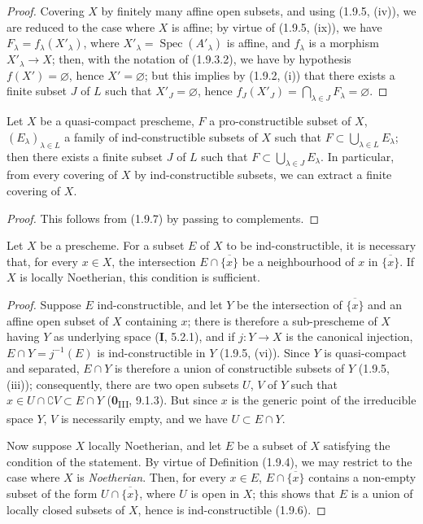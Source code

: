 \begin{proof}
Covering $X$ by finitely many affine open subsets, and using (1.9.5,
(iv)), we are reduced to the case where $X$ is affine; by virtue of (1.9.5,
(ix)), we have $F_\lambda=f_\lambda(X'_\lambda)$,
where $X'_\lambda=\operatorname{Spec}(A'_\lambda)$ is affine, and $f_\lambda$
is a morphism $X'_\lambda\to X$; then, with the notation of (1.9.3.2),
we have by hypothesis $f(X')=\varnothing$, hence $X'=\varnothing$; but this
implies by (1.9.2, (i)) that there exists a finite subset $J$ of $L$ such
that $X'_J=\varnothing$, hence
$f_J(X'_J)=\bigcap_{\lambda\in J}F_\lambda=\varnothing$.
\end{proof}

\begin{corollary}[1.9.9]
\label{IV.1.9.9}
Let $X$ be a quasi-compact prescheme, $F$ a pro-constructible subset of
$X$, $(E_\lambda)_{\lambda\in L}$ a family of ind-constructible subsets
of $X$ such that $F\subset\bigcup_{\lambda\in L}E_\lambda$; then there
exists a finite subset $J$ of $L$ such that
$F\subset\bigcup_{\lambda\in J}E_\lambda$. In particular, from every
covering of $X$ by ind-constructible subsets, we can extract a finite
covering of $X$.
\end{corollary}

\begin{proof}
This follows from (1.9.7) by passing to complements.
\end{proof}

\begin{proposition}[1.9.10]
\label{IV.1.9.10}
Let $X$ be a prescheme. For a subset $E$ of $X$ to be
ind-constructible, it is necessary that, for every $x\in X$, the intersection
$E\cap\overline{\{x\}}$ be a neighbourhood of $x$ in
$\overline{\{x\}}$. If $X$ is locally Noetherian, this condition is
sufficient.
\end{proposition}

\begin{proof}
Suppose $E$ ind-constructible, and let $Y$ be the intersection of
$\overline{\{x\}}$ and an affine open subset of $X$ containing $x$; there is
therefore a sub-prescheme of $X$ having $Y$ as underlying space (\textbf{I}, 5.2.1),
and if $j:Y\to X$ is the canonical injection,
$E\cap Y=j^{-1}(E)$ is ind-constructible in $Y$ (1.9.5, (vi)). Since $Y$
is quasi-compact and separated, $E\cap Y$ is therefore a union of
constructible subsets of $Y$ (1.9.5, (iii)); consequently, there are two
open subsets $U$, $V$ of $Y$ such that
$x\in U\cap\complement V\subset E\cap Y$ (\textbf{0}\textsubscript{III}, 9.1.3).
But since $x$ is the generic point of the irreducible space $Y$, $V$ is
necessarily empty, and we have $U\subset E\cap Y$.

Now suppose $X$ locally Noetherian, and let $E$ be a subset of
$X$ satisfying the condition of the statement. By virtue of Definition
(1.9.4), we may restrict to the case where $X$ is \emph{Noetherian}. Then, for every
$x\in E$, $E\cap\overline{\{x\}}$ contains a non-empty subset of the form
$U\cap\overline{\{x\}}$, where $U$ is open in $X$; this shows that $E$
is a union of locally closed subsets of $X$, hence is
ind-constructible (1.9.6).
\end{proof}

